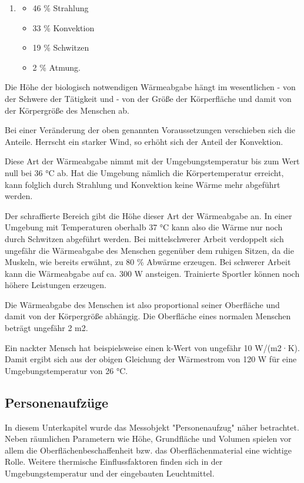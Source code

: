 \begin{enumerate}
\item 
\begin{itemize}
	\item  46 \% Strahlung
	\item  33 \% Konvektion
	\item  19 \% Schwitzen
	\item   2 \% Atmung.
\end{itemize}
\end{enumerate}	


Die Höhe der biologisch notwendigen Wärmeabgabe hängt im wesentlichen
- von der Schwere der Tätigkeit und
- von der Größe der Körperfläche 
und damit von der Körpergröße des Menschen ab.

Bei einer Veränderung der oben genannten Voraussetzungen verschieben sich die Anteile. Herrscht ein starker Wind, so erhöht sich der Anteil der Konvektion.

Diese Art der Wärmeabgabe nimmt mit der Umgebungstemperatur bis zum Wert null bei 36 °C ab. Hat die Umgebung nämlich die Körpertemperatur erreicht, kann folglich durch Strahlung und Konvektion keine Wärme mehr abgeführt werden.

Der schraffierte Bereich gibt die Höhe dieser Art der
Wärmeabgabe an. In einer Umgebung mit Temperaturen oberhalb 37 °C kann also die Wärme
nur noch durch Schwitzen abgeführt werden. Bei mittelschwerer Arbeit verdoppelt sich
ungefähr die Wärmeabgabe des Menschen gegenüber dem ruhigen Sitzen, da die Muskeln,
wie bereits erwähnt, zu 80 \% Abwärme erzeugen. Bei schwerer Arbeit kann die Wärmeabgabe auf ca. 300 W ansteigen. Trainierte Sportler können noch höhere Leistungen erzeugen.

Die
Wärmeabgabe des Menschen ist also proportional seiner Oberfläche und damit von der Körpergröße abhängig. Die Oberfläche eines normalen Menschen beträgt ungefähr 2 m2.

Ein nackter Mensch hat beispielsweise einen k-Wert von
ungefähr 10 W/(m2·K). Damit ergibt sich aus der obigen Gleichung der Wärmestrom von 120
W für eine Umgebungstemperatur von 26 °C. \cite{MenschWaerme}

\subsection{Personenaufzüge}

In diesem Unterkapitel wurde das Messobjekt "Personenaufzug" näher betrachtet. Neben räumlichen Parametern wie Höhe, Grundfläche und Volumen spielen vor allem die Oberflächenbeschaffenheit bzw. das Oberflächenmaterial eine wichtige Rolle. Weitere thermische Einflussfaktoren finden sich in der Umgebungstemperatur und der eingebauten Leuchtmittel.



